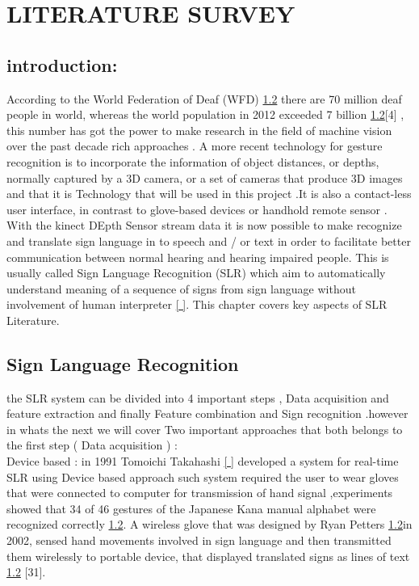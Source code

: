 

\chapter{LITERATURE SURVEY}

\section{introduction:}

According to the World Federation of Deaf (WFD) \ref{} there are 70 million deaf people in world, whereas the world population in 2012 exceeded 7 billion \ref{}[4] , this number has got the power to make research in the field of machine vision  over  the  past  decade rich  approaches .
A  more  recent   technology  for gesture   recognition  is to  incorporate   the  information   of object   distances,   or depths,   normally   captured   by a 3D camera,   or a set  of cameras  that  produce 3D images and that it is Technology that will be used in this project  .It is also a contact-less  user interface,   in contrast   to glove-based   devices  or handhold   remote  sensor .
With the kinect DEpth Sensor stream data it is now possible to make recognize and  translate sign language in to speech and / or text in order to facilitate better communication between normal hearing and hearing impaired people. This is usually called Sign Language Recognition (SLR) which  aim  to automatically understand meaning of a sequence of signs from sign language without involvement of human interpreter \ref{ }. This chapter covers key aspects of SLR Literature.

\section{ Sign  Language Recognition}  

the SLR system can be divided into 4 important  steps , Data acquisition and feature extraction and finally Feature combination and Sign recognition .however in whats the next  we will cover Two important approaches that both  belongs to the first step ( Data acquisition ) :\\

Device based :
in  1991 Tomoichi Takahashi  \ref{ } developed a system for real-time SLR  using Device based approach such system required the user to wear gloves that were connected to computer for transmission of hand signal ,experiments showed that 34 of 46 gestures of the Japanese Kana manual alphabet were recognized correctly \ref{}.
 A wireless glove that was designed by Ryan Petters  \ref{}in 2002, sensed hand movements involved in sign language and then transmitted them wirelessly to portable device, that displayed translated signs as lines of text \ref{} [31].
 

